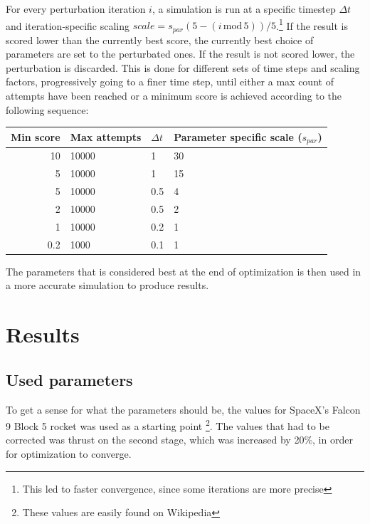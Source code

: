 \documentclass[11pt]{article}
\begin{document}
For every perturbation iteration $i$, a simulation is run at a specific timestep $\Delta t$ and iteration-specific scaling 
$ scale = s_{par} (5 - (i\,\text{mod}\,5)) / 5$.\footnote{This led to faster convergence, since some iterations are more precise} If the result is scored lower than the currently best score, the currently best choice of parameters are set to
the perturbated ones.
If the result is not scored lower, the perturbation is discarded.
This is done for different sets of time steps and scaling factors, progressively going to a finer time step, until either a max count of attempts have been reached or a minimum score is achieved according to the following sequence:
\begin{center}
  \begin{tabular}{ r | l | l | l  }
    Min score & Max attempts & $\Delta t$ & Parameter specific scale ($s_{par}$) \\
    \hline
    10 & 10000 & 1 & 30 \\
    5 & 10000 & 1 & 15 \\
    5 & 10000 & 0.5 & 4 \\
    2 & 10000 & 0.5 & 2 \\
    1 & 10000 & 0.2 & 1 \\
    0.2 & 1000 & 0.1 & 1 \\
  \end{tabular}
\end{center}

The parameters that is considered best at the end of optimization is then used in a more accurate simulation to produce results.

\section{Results}
\subsection{Used parameters}
To get a sense for what the parameters should be, the values for SpaceX's Falcon 9 Block 5 rocket was used as a starting point
\footnote{These values are easily found on Wikipedia}. The values that had to be corrected was thrust on the second stage, which was increased by 20\%, in order for optimization to converge.
\end{document}
